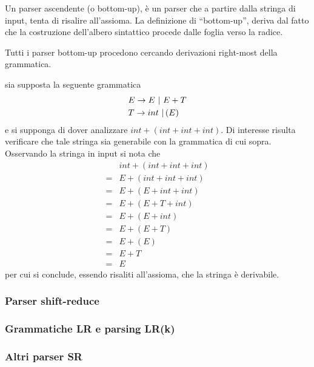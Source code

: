 \documentclass{subfiles}
\begin{document}
Un parser ascendente (o bottom-up), è un parser che a partire dalla stringa di input, tenta di risalire all'assioma.
La definizione di ``bottom-up'', deriva dal fatto che la costruzione dell'albero sintattico procede dalle foglia verso la radice.

\begin{Remark*}
    Tutti i parser bottom-up procedono cercando  derivazioni right-most della grammatica.

    \begin{Example*}
        sia supposta la seguente grammatica
        $$\begin{aligned}
                 & \Grammar{E}{E}[E + T] \\
                 & \Grammar{T}{int}[(E)]
            \end{aligned}$$
        e si supponga di dover analizzare $int  + (int + int + int)$.
        Di interesse risulta verificare che tale stringa sia generabile con la grammatica di cui sopra.
        Osservando la stringa in input si nota che
        $$\begin{aligned}
                  & int + (int + int + int) \\
                = & E + (int + int + int)   \\
                = & E + (E + int + int)     \\
                = & E + (E + T + int)       \\
                = & E + (E + int)           \\
                = & E + (E + T)             \\
                = & E + (E)                 \\
                = & E + T                   \\
                = & E
            \end{aligned}$$
        per cui si conclude, essendo risaliti all'assioma, che la stringa è derivabile.
    \end{Example*}
\end{Remark*}

\subsubsection{Parser shift-reduce}


\subsubsection{Grammatiche LR e parsing LR(k)}


\subsubsection{Altri parser SR}

\end{document}
